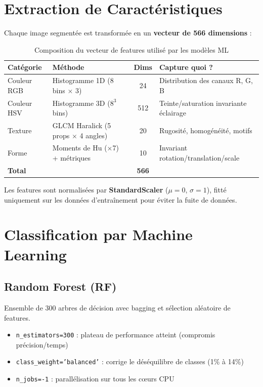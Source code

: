 \documentclass[12pt,a4paper]{article}
\begin{document}
\section{Extraction de Caractéristiques}

Chaque image segmentée est transformée en un \textbf{vecteur de 566 dimensions} :

\begin{table}[H]
\centering\small
\begin{tabular}{llcp{5cm}}
\toprule
\textbf{Catégorie} & \textbf{Méthode} & \textbf{Dims} & \textbf{Capture quoi ?} \\
\midrule
Couleur RGB & Histogramme 1D (8 bins $\times$ 3) & 24 & Distribution des canaux R, G, B \\
Couleur HSV & Histogramme 3D ($8^3$ bins) & 512 & Teinte/saturation invariante éclairage \\
Texture & GLCM Haralick (5 props $\times$ 4 angles) & 20 & Rugosité, homogénéité, motifs \\
Forme & Moments de Hu ($\times$7) + métriques & 10 & Invariant rotation/translation/scale \\
\midrule
\textbf{Total} & & \textbf{566} & \\
\bottomrule
\end{tabular}
\caption{Composition du vecteur de features utilisé par les modèles ML}
\end{table}

Les features sont normalisées par \textbf{StandardScaler} ($\mu=0$, $\sigma=1$), 
fitté uniquement sur les données d'entraînement pour éviter la fuite de données.

\section{Classification par Machine Learning}

\subsection{Random Forest (RF)}

Ensemble de 300 arbres de décision avec bagging et sélection aléatoire de features.
\begin{itemize}
  \item \texttt{n\_estimators=300} : plateau de performance atteint (compromis précision/temps)
  \item \texttt{class\_weight='balanced'} : corrige le déséquilibre de classes (1\% à 14\%)
  \item \texttt{n\_jobs=-1} : parallélisation sur tous les cœurs CPU
\end{itemize}
\end{document}
